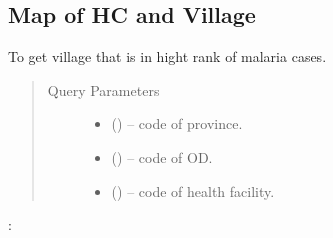 \documentclass[letterpaper,10pt,english,openany,oneside]{sphinxmanual}
\begin{document}
\subsection{Map of HC and Village}
\label{\detokenize{api-cmi/v1:map-of-hc-and-village}}

\begin{fulllineitems}
\label{\detokenize{api-cmi/v1:get--api-malaria-info-v1-Map-village_hf}}
\sphinxAtStartPar
To get village that is in hight rank of malaria cases.
\begin{quote}\begin{description}
\item[{Query Parameters}] \leavevmode\begin{itemize}
\item {} 
\sphinxAtStartPar
{} () – code of province.

\item {} 
\sphinxAtStartPar
{} () – code of OD.

\item {} 
\sphinxAtStartPar
{} () – code of health facility.

\end{itemize}

\end{description}\end{quote}

\sphinxAtStartPar
{}:


\end{fulllineitems}
\end{document}
